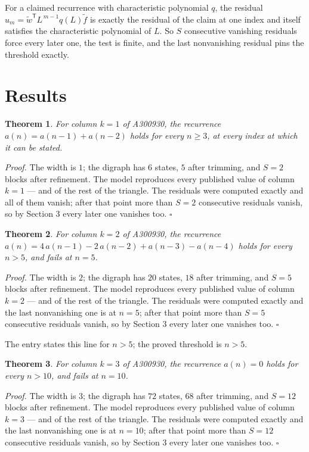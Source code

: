 \documentclass[11pt]{article}
\newtheorem{theorem}{Theorem}
\theoremstyle{definition}
\begin{document}
For a claimed recurrence with characteristic polynomial $q$, the residual $u_m = \tilde w^{\mathsf T}L^{\,m-1}q(L)\tilde f$ is exactly the residual of the claim at one index and itself satisfies the characteristic polynomial of $L$. So $S$ consecutive vanishing residuals force every later one, the test is finite, and the last nonvanishing residual pins the threshold exactly.

\section{Results}

\begin{theorem} For column $k = 1$ of A300930, the recurrence $a(n) = a(n-1) + a(n-2)$ holds for every $n \ge 3$, at every index at which it can be stated.\end{theorem}

{\itshape Proof.} The width is $1$; the digraph has $6$ states, $5$ after trimming, and $S = 2$ blocks after refinement. The model reproduces every published value of column $k = 1$ --- and of the rest of the triangle. The residuals were computed exactly and all of them vanish; after that point more than $S = 2$ consecutive residuals vanish, so by Section 3 every later one vanishes too. $\square$

\begin{theorem} For column $k = 2$ of A300930, the recurrence $a(n) = 4\,a(n-1) - 2\,a(n-2) + a(n-3) - a(n-4)$ holds for every $n > 5$, and fails at $n = 5$.\end{theorem}

{\itshape Proof.} The width is $2$; the digraph has $20$ states, $18$ after trimming, and $S = 5$ blocks after refinement. The model reproduces every published value of column $k = 2$ --- and of the rest of the triangle. The residuals were computed exactly and the last nonvanishing one is at $n = 5$; after that point more than $S = 5$ consecutive residuals vanish, so by Section 3 every later one vanishes too. $\square$

The entry states this line for $n > 5$; the proved threshold is $n > 5$.

\begin{theorem} For column $k = 3$ of A300930, the recurrence $a(n) = 0$ holds for every $n > 10$, and fails at $n = 10$.\end{theorem}

{\itshape Proof.} The width is $3$; the digraph has $72$ states, $68$ after trimming, and $S = 12$ blocks after refinement. The model reproduces every published value of column $k = 3$ --- and of the rest of the triangle. The residuals were computed exactly and the last nonvanishing one is at $n = 10$; after that point more than $S = 12$ consecutive residuals vanish, so by Section 3 every later one vanishes too. $\square$
\end{document}
